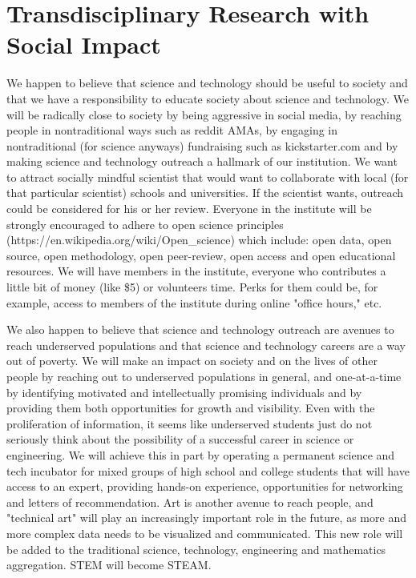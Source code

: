 \section{Transdisciplinary Research with Social Impact}

We happen to believe that science and technology should be useful to society and that we have a responsibility to educate society about science and technology. We will be radically close to society by being aggressive in social media, by reaching people in nontraditional ways such as reddit AMAs, by engaging in nontraditional (for science anyways) fundraising such as kickstarter.com and by making science and technology outreach a hallmark of our institution. We want to attract socially mindful scientist that would want to collaborate with local (for that particular scientist) schools and universities. If the scientist wants, outreach could be considered for his or her review. Everyone in the institute will be strongly encouraged to adhere to open science principles (https://en.wikipedia.org/wiki/Open\_science) which include: open data, open source, open methodology, open peer-review, open access and open educational resources. We will have members in the institute, everyone who contributes a little bit of money (like \$5) or volunteers time. Perks for them could be, for example, access to members of the institute during online "office hours," etc. 

We also happen to believe that science and technology outreach are avenues to reach underserved populations and that science and technology careers are a way out of poverty. We will make an impact on society and on the lives of other people by reaching out to underserved populations in general, and one-at-a-time by identifying motivated and intellectually promising individuals and by providing them both opportunities for growth and visibility. Even with the proliferation of information, it seems like underserved students just do not seriously think about the possibility of a successful career in science or engineering. We will achieve this in part by operating a permanent science and tech incubator for mixed groups of high school and college students that will have access to an expert, providing hands-on experience, opportunities for networking and letters of recommendation. Art is another avenue to reach people, and "technical art" will play an increasingly important role in the future, as more and more complex data needs to be visualized and communicated. This new role will be added to the traditional science, technology, engineering and mathematics aggregation. STEM will become STEAM.

